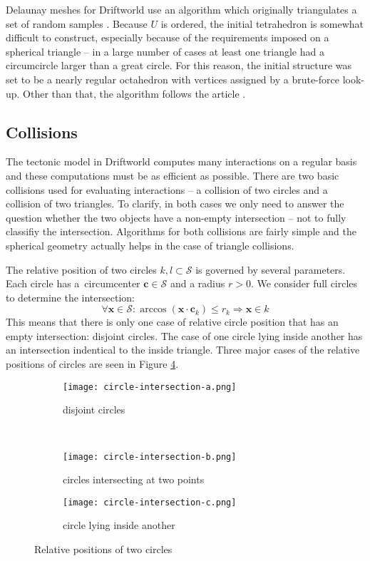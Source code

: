 Delaunay meshes for Driftworld use an algorithm which originally triangulates a set of random samples \cite{ma}. Because $U$ is ordered, the initial tetrahedron is somewhat difficult to construct, especially because of the requirements imposed on a spherical triangle -- in a large number of cases at least one triangle had a circumcircle larger than a great circle. For this reason, the initial structure was set to be a nearly regular octahedron with vertices assigned by a brute-force look-up. Other than that, the algorithm follows the article \cite{ma}.
\subsection{Collisions}
The tectonic model in Driftworld computes many interactions on a regular basis and these computations must be as efficient as possible. There are two basic collisions used for evaluating interactions -- a collision of two circles and a collision of two triangles. To clarify, in both cases we only need to answer the question whether the two objects have a non-empty intersection -- not to fully classifiy the intersection. Algorithms for both collisions are fairly simple and the spherical geometry actually helps in the case of triangle collisions.

The relative position of two circles $k,l\subset\mathcal{S}$ is governed by several parameters. Each circle has a~circumcenter $\mathbf{c} \in \mathcal{S}$ and a radius $r > 0$. We consider full circles to determine the intersection:
$$\forall\mathbf{x}\in\mathcal{S}:\arccos(\mathbf{x}\cdot\mathbf{c}_k) \le r_k\Rightarrow\mathbf{x}\in k$$
This means that there is only one case of relative circle position that has an empty intersection: disjoint circles. The case of one circle lying inside another has an intersection indentical to the inside triangle. Three major cases of the relative positions of circles are seen in Figure \ref{fig:circle-collisions}.
\begin{figure}[ht]
\centering
\begin{subfigure}{7cm}
\texttt{[image: circle-intersection-a.png]}
\caption{disjoint circles}
\label{fig:disjoint-circles}
\end{subfigure}\\
\begin{subfigure}{7cm}
\texttt{[image: circle-intersection-b.png]}
\caption{circles intersecting at two points}
\label{fig:circles-intersecting-at-two-points}
\end{subfigure}
\hspace*{1cm}
\begin{subfigure}{7cm}
\texttt{[image: circle-intersection-c.png]}
\caption{circle lying inside another}
\label{fig:circle-lying-inside-another}
\end{subfigure}
\caption{Relative positions of two circles}
\label{fig:circle-collisions}
\end{figure}

